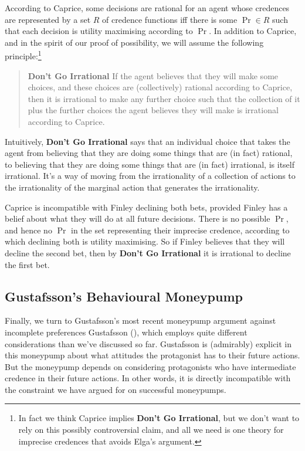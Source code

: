 \documentclass[
  11pt,
  letterpaper,
  DIV=11,
  numbers=noendperiod,
  twoside]{scrartcl}
\begin{document}
According to Caprice, some decisions are rational for an agent whose
credences are represented by a set \(R\) of credence functions iff there
is some \(\Pr \in R\) such that each decision is utility maximising
according to \(\Pr\). In addition to Caprice, and in the spirit of our
proof of possibility, we will assume the following principle:\footnote{In
  fact we think Caprice implies \textbf{Don't Go Irrational}, but we
  don't want to rely on this possibly controversial claim, and all we
  need is one theory for imprecise credences that avoids Elga's
  argument.}

\begin{quote}
\textbf{Don't Go Irrational} If the agent believes that they will make
some choices, and these choices are (collectively) rational according to
Caprice, then it is irrational to make any further choice such that the
collection of it plus the further choices the agent believes they will
make is irrational according to Caprice.
\end{quote}

Intuitively, \textbf{Don't Go Irrational} says that an individual choice
that takes the agent from believing that they are doing some things that
are (in fact) rational, to believing that they are doing some things
that are (in fact) irrational, is itself irrational. It's a way of
moving from the irrationality of a collection of actions to the
irrationality of the marginal action that generates the irrationality.

Caprice is incompatible with Finley declining both bets, provided Finley
has a belief about what they will do at all future decisions. There is
no possible \(\Pr\), and hence no \(\Pr\) in the set representing their
imprecise credence, according to which declining both is utility
maximising. So if Finley believes that they will decline the second bet,
then by \textbf{Don't Go Irrational} it is irrational to decline the
first bet.

\subsection{Gustafsson's Behavioural
Moneypump}\label{gustafssons-behavioural-moneypump}

Finally, we turn to Gustafsson's most recent moneypump argument against
incomplete preferences Gustafsson
(), which employs quite
different considerations than we've discussed so far. Gustafsson is
(admirably) explicit in this moneypump about what attitudes the
protagonist has to their future actions. But the moneypump depends on
considering protagonists who have intermediate credence in their future
actions. In other words, it is directly incompatible with the constraint
we have argued for on successful moneypumps.
\end{document}
